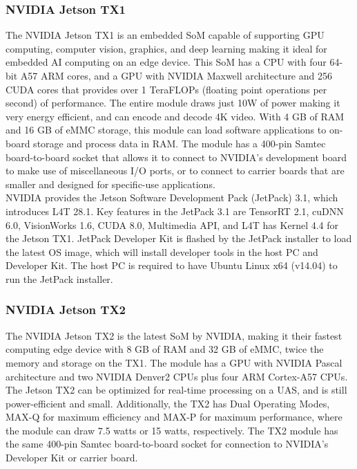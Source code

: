\subsubsection{NVIDIA Jetson TX1}

The NVIDIA Jetson TX1 is an embedded SoM capable of supporting GPU computing, computer 
vision, graphics, and deep learning making it ideal for embedded AI computing
on an edge device. This SoM has a CPU with four 64-bit A57 ARM cores, and a GPU with 
NVIDIA Maxwell architecture and 256 CUDA cores that provides over 1 TeraFLOPs (floating 
point operations per second) of performance\cite{TX1Wiki, JetsonGenius}. The entire module 
draws just 10W of power making it very energy efficient, and can encode and decode 4K 
video. With 4 GB of RAM and 16 GB of eMMC storage, this module can load software 
applications to on-board storage and process data in RAM\cite{LinuxDot}. The module has 
a 400-pin Samtec board-to-board socket that allows it to connect to NVIDIA's development
board to make use of miscellaneous I/O ports, or to connect to carrier boards that are 
smaller and designed for specific-use applications.\\

NVIDIA provides the Jetson Software Development Pack (JetPack) 3.1, which introduces 
L4T 28.1. Key features in the JetPack 3.1 are TensorRT 2.1, cuDNN 6.0, VisionWorks 1.6, 
CUDA 8.0, Multimedia API, and L4T has Kernel 4.4 for the Jetson TX1. JetPack Developer 
Kit is flashed by the JetPack installer to load the latest OS image, which will install 
developer tools in the host PC and Developer Kit. The host PC is required to have 
Ubuntu Linux x64 (v14.04) to run the JetPack installer\cite{JetPack, JetPackRel}.\\ 

\subsubsection{NVIDIA Jetson TX2}

The NVIDIA Jetson TX2 is the latest SoM by NVIDIA, making it their fastest computing edge
device with 8 GB of RAM and 32 GB of eMMC, twice the memory and storage on the TX1. The 
module has a GPU with NVIDIA Pascal architecture and two NVIDIA Denver2 CPUs plus four 
ARM Cortex-A57 CPUs\cite{TX2Wiki, JetsonFAQ}. The Jetson TX2 can be optimized for 
real-time processing on a UAS, and is 
still power-efficient and small\cite{JetsonGenius}. Additionally, the TX2 has 
Dual Operating Modes, MAX-Q for maximum efficiency and MAX-P for maximum performance, 
where the module can draw 7.5 watts or 15 watts, respectively\cite{TechnoByte}. The TX2 
module has the same 400-pin Samtec board-to-board socket for connection to NVIDIA's 
Developer Kit or carrier board. \\

